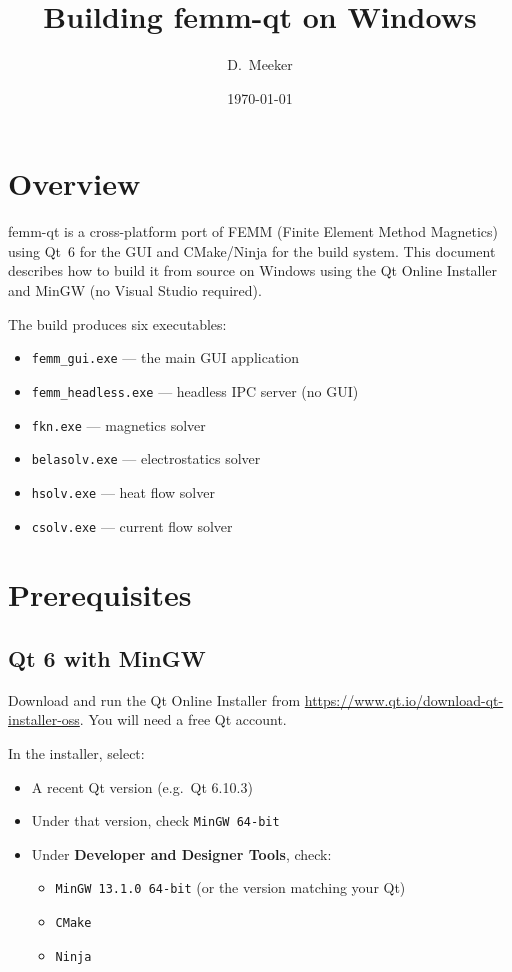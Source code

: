 \documentclass[11pt]{article}
\title{Building femm-qt on Windows}
\author{D.\ Meeker}
\date{\today}
\begin{document}
\maketitle

\section{Overview}

femm-qt is a cross-platform port of FEMM (Finite Element Method Magnetics)
using Qt~6 for the GUI and CMake/Ninja for the build system.  This document
describes how to build it from source on Windows using the Qt Online
Installer and MinGW (no Visual Studio required).

The build produces six executables:
\begin{itemize}[nosep]
  \item \texttt{femm\_gui.exe} --- the main GUI application
  \item \texttt{femm\_headless.exe} --- headless IPC server (no GUI)
  \item \texttt{fkn.exe} --- magnetics solver
  \item \texttt{belasolv.exe} --- electrostatics solver
  \item \texttt{hsolv.exe} --- heat flow solver
  \item \texttt{csolv.exe} --- current flow solver
\end{itemize}

\section{Prerequisites}

\subsection{Qt 6 with MinGW}

Download and run the Qt Online Installer from
\url{https://www.qt.io/download-qt-installer-oss}.  You will need a
free Qt account.

In the installer, select:
\begin{itemize}[nosep]
  \item A recent Qt version (e.g.\ Qt 6.10.3)
  \item Under that version, check \texttt{MinGW 64-bit}
  \item Under \textbf{Developer and Designer Tools}, check:
    \begin{itemize}[nosep]
      \item \texttt{MinGW 13.1.0 64-bit} (or the version matching your Qt)
      \item \texttt{CMake}
      \item \texttt{Ninja}
    \end{itemize}
\end{itemize}
\end{document}
